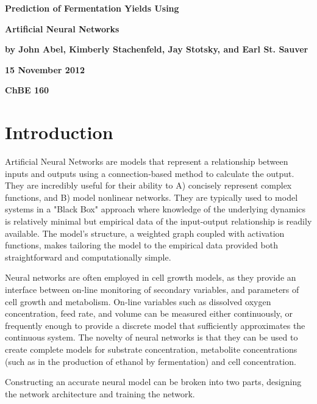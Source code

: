 \documentclass[10pt]{article}
\begin{document}
\pagestyle{empty}
\vspace*{2 in}
\centerline{\textbf{\LARGE Prediction of Fermentation Yields Using}}
\vspace{.25in}
\centerline{\textbf{\LARGE Artificial Neural Networks}}
\vspace{.25 in}
\centerline{\textbf{by John Abel, Kimberly Stachenfeld, Jay Stotsky, and Earl St. Sauver}}
\vspace{.125 in}
\centerline{\textbf{15 November 2012}}
\vspace{.125 in}
\centerline{\textbf{ChBE 160}}
\vspace{1 in}

\pagebreak
\section{Introduction}
Artificial Neural Networks are models that represent a relationship between inputs and outputs using a connection-based method to calculate the output. They are incredibly useful for their ability to A) concisely represent complex functions, and B) model nonlinear networks. They are typically used to model systems in a "Black Box" approach where knowledge of the underlying dynamics is relatively minimal but empirical data of the input-output relationship is readily available. The model’s structure, a weighted graph coupled with activation functions, makes tailoring the model to the empirical data provided both straightforward and computationally simple. 

Neural networks are often employed in cell growth models, as they provide an interface between on-line monitoring of secondary variables, and parameters of cell growth and metabolism. On-line variables such as dissolved oxygen concentration, feed rate, and volume can be measured either continuously, or frequently enough to provide a discrete model that sufficiently approximates the continuous system. The novelty of neural networks is that they can be used to create complete models for substrate concentration, metabolite concentrations (such as in the production of ethanol by fermentation) and cell concentration. 

Constructing an accurate neural model can be broken into two parts, designing the network architecture and training the network. 
\end{document}
